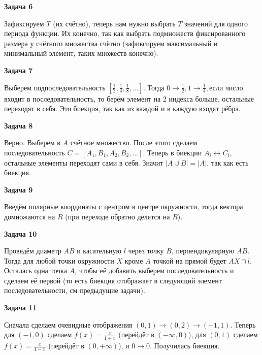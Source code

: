 \begin{center}
\textbf{Задача 6}
\end{center}
Зафиксируем $\displaystyle T$ (их счётно), теперь нам нужно выбрать $\displaystyle T$ значений для одного периода функции. Их конечно, так как выбрать подмножеств фиксированного размера у счётного множества счётно (зафиксируем максимальный и минимальный элемент, таких множеств конечно).

\begin{center}
\textbf{Задача 7}
\end{center}
Выберем подпоследовательность $\displaystyle \left[\frac{1}{2} ,\frac{1}{4} ,\frac{1}{8} ,...\right]$. Тогда $\displaystyle 0\rightarrow \frac{1}{2} ,1\rightarrow \frac{1}{4} ,$если число входит в последовательность, то берём элемент на 2 индекса больше, остальные переходят в себя. Это биекция, так как из каждой и в каждую входят рёбра.

\begin{center}
\textbf{Задача 8}
\end{center}
Верно. Выберем в $\displaystyle A$ счётное множество. После этого сделаем последовательность $\displaystyle C=[ A_{1} ,B_{1} ,A_{2} ,B_{2} ,...]$. Теперь в биекции $\displaystyle A_{i} \leftrightarrow C_{i}$, остальные элементы переходят сами в себя. Значит $\displaystyle |A\cup B|=|A|$, так как есть биекция.

\begin{center}
\textbf{Задача 9}
\end{center}
Введём полярные координаты с центром в центре окружности, тогда вектора домножаются на $\displaystyle R$ (при переходе обратно делятся на $\displaystyle R$).

\begin{center}
\textbf{Задача 10}
\end{center}
Проведём диаметр $\displaystyle AB$ и касательную $\displaystyle l$ через точку $\displaystyle B$, перпендикулярную $\displaystyle AB$. Тогда для любой точки окружности $\displaystyle X$ кроме $\displaystyle A$ точкой на прямой будет $\displaystyle AX\cap l$. Осталась одна точка $\displaystyle A$, чтобы её добавить выберем последовательность и сделаем её первой (то есть биекция отображает в следующий элемент последовательности, см предыдущие задачи).

\begin{center}
\textbf{Задача 11} 
\end{center}
Сначала сделаем очевидные отображения $\displaystyle ( 0,1)\rightarrow ( 0,2)\rightarrow ( -1,1)$. Теперь для $\displaystyle ( -1,0)$ сделаем $\displaystyle f( x) =\frac{x}{1+x}$ (перейдёт в $\displaystyle ( -\infty ,0)$), для $\displaystyle ( 0,1)$ сделаем $\displaystyle f( x) =\frac{x}{1-x}$ (перейдёт в $\displaystyle ( 0,+\infty )$), и $\displaystyle 0\rightarrow 0$. Получилась биекция.

